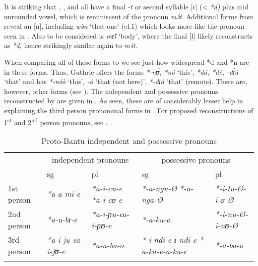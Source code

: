 \documentclass[output=paper]{langsci/langscibook}
\begin{document}
\noindent
It is striking that , ,  and  all have a final \textit{-t} or second syllable [r] (< \textit{*d)} plus mid unrounded vowel, which is reminiscent of the  pronoun \textit{mə́t}. Additional  forms from \citet[301]{Mous2003} reveal an [n], including \textit{wə̂n} ‘that one’ (cl.1) which looks more like the  pronoun seen in . Also to be considered is  \textit{mɛ̌l} ‘body’, where the final [l] likely reconstructs as \textit{*d,} hence strikingly similar again to  \textit{mə́t}.

When comparing all of these forms to  we see just how widespread *d and *n are in these forms. Thus, Guthrie offers the  forms \textit{{*-nʊ́,}} \textit{*nó} ‘this’, \textit{*dá, *dé, -dɪ́á} ‘that’ and \citet{Meeussen1967} has \textit{*\nobreakdash-nóò} ‘this’, \textit{-ó} ‘that (not here)’, \textit{*-dɪá} ‘that’ (remote). There are, however, other forms (see \citealt{Weier1985}). The  independent and possessive pronouns reconstructed by \citet[215]{KambaMuzenga2003}  are given in . As seen, these are of considerably lesser help in explaining the third person pronominal forms in . For proposed reconstructions of  1\textsuperscript{st} and 2\textsuperscript{nd} person pronouns, see \citealt[161]{Babaev2008}.

\begin{table}
\caption{Proto-Bantu independent and possessive pronouns \citep[115]{KambaMuzenga2003}}
    \label{extab:grassfields:25}
\begin{tabularx}{\textwidth}{XXXXX}
\lsptoprule
         & \multicolumn{2}{c}{  independent pronouns} & \multicolumn{2}{c}{  possessive pronouns}\\
& {  sg} & {  pl} & {  sg} & {  pl}\\
\midrule
 1st person & \textit{*a-a-mi-e} & \textit{*a-i-cu-e}\newline
			  \textit{*a-i-cʊ-e} 
				  & \textit{*-a-ngu-Ø}\newline
				    \textit{*-a-nga-Ø} & \textit{*-i-tu-Ø\newline *-i-ʊ-Ø}\\
\tablevspace
 2nd person & \textit{*a-u-bɪ-e} & \textit{*a-i-ɲu-e\newline *a-i-ɲʊ-e} & \textit{*-a-ku-o} & \textit{*-i-nu-Ø\newline *-i-nʊ-Ø}\\
 \tablevspace
3rd person & \textit{*a-i-ju-e\newline *a-i-jʊ-e} & \textit{*a-a-ba-o} & \textit{*-i-ndi-e\newline *-ɪ-ndi-e\newline
						*-a-ka-e\newline *-a-ku-e} 
							  & \textit{*-a-ba-o}\\
\lspbottomrule
\end{tabularx}
\end{table}
\end{document}

